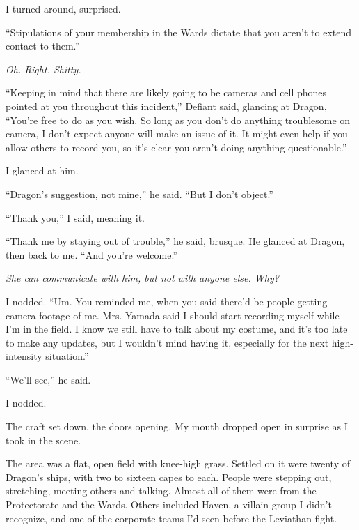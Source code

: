 I turned around, surprised.



``Stipulations of your membership in the Wards dictate that you aren't to extend contact to them.''



\emph{Oh.  Right.  Shitty.}



``Keeping in mind that there are likely going to be cameras and cell phones pointed at you throughout this incident,'' Defiant said, glancing at Dragon, ``You're free to do as you wish.  So long as you don't do anything troublesome on camera, I don't expect anyone will make an issue of it.  It might even help if you allow others to record you, so it's clear you aren't doing anything questionable.''



I glanced at him.



``Dragon's suggestion, not mine,'' he said.  ``But I don't object.''



``Thank you,'' I said, meaning it.



``Thank me by staying out of trouble,'' he said, brusque.  He glanced at Dragon, then back to me.  ``And you're welcome.''



\emph{She can communicate with him, but not with anyone else.  Why?}



I nodded.  ``Um.  You reminded me, when you said there'd be people getting camera footage of me.  Mrs. Yamada said I should start recording myself while I'm in the field.  I know we still have to talk about my costume, and it's too late to make any updates, but I wouldn't mind having it, especially for the next high-intensity situation.''



``We'll see,'' he said.



I nodded.



The craft set down, the doors opening.  My mouth dropped open in surprise as I took in the scene.



The area was a flat, open field with knee-high grass.  Settled on it were twenty of Dragon's ships, with two to sixteen capes to each.  People were stepping out, stretching, meeting others and talking.  Almost all of them were from the Protectorate and the Wards.  Others included Haven, a villain group I didn't recognize, and one of the corporate teams I'd seen before the Leviathan fight.



